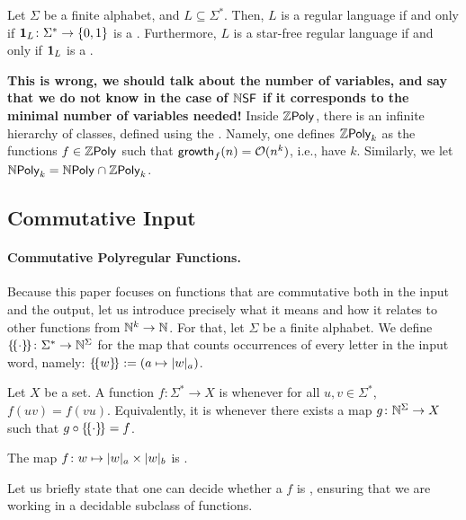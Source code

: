 \begin{example}
    \label{regular-language:ex}
    Let $\Sigma$ be a finite alphabet, and
    $L \subseteq \Sigma^*$. Then,
    $L$ is a regular language if and only if
    $\mathbf{1}_{L} \colon \Sigma^* \to \mathopen{\{} 0,1 \mathclose{\}}$ is a
    .
    Furthermore, $L$ is a star-free regular language
    if and only if $\mathbf{1}_{L}$ is a
    .
\end{example}

\textbf{This is wrong, we should talk about the number of variables,
    and say that we do not know in the case of $\NSF$ if it corresponds
    to the minimal number of variables needed!}
\AP Inside $\ZPoly$, there is an infinite hierarchy of classes, defined using
the . Namely, one defines $\ZPoly[k]$ as the functions $f \in
\ZPoly$ such that $\mathsf{growth}_{f}(n) = \mathcal{O}(n^k)$, i.e., have 
$k$. Similarly, we let $\NPoly[k] = \NPoly \cap \ZPoly[k]$.


\subsection{Commutative Input}

\paragraph{Commutative Polyregular Functions.}
\AP 
Because this paper focuses on functions that are commutative both in the
input and the output, let us introduce precisely what it means and how it
relates to other functions from $\mathbb{N}^k \to \mathbb{N}$. For that, let $\Sigma$ be a
finite alphabet. We define $\commute \colon \Sigma^* \to \Nat^\Sigma$ for the
map that counts occurrences of every letter in the input word, namely: $
\commute[w] \defined (a \mapsto \card[a]{w})$.

\AP Let $X$ be a set. A function $f \colon \Sigma^* \to X$ is
 whenever for all $u,v \in \Sigma^*$, $f(uv) = f(vu)$.
Equivalently, it is  whenever there exists a map $g \colon
\mathbb{N}^\Sigma \to X$ such that $g \circ \commute = f$.

\begin{example}
    \label{commutative-function:ex}
    The map $f \colon w \mapsto \card[a]{w} \times \card[b]{w}$ is .
\end{example}

Let us briefly state that one can decide whether a  $f$ is , ensuring that we are working in a decidable
subclass of functions. 

